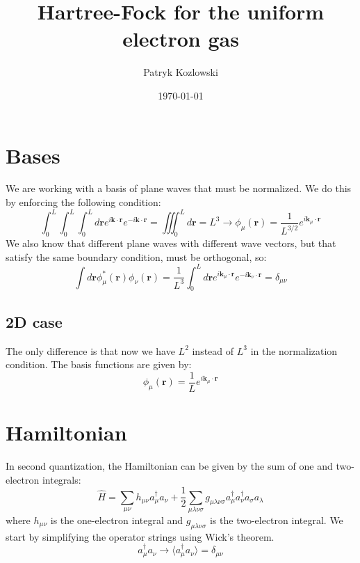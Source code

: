 \documentclass[12pt]{article}
\author{Patryk Kozlowski}
\title{Hartree-Fock for the uniform electron gas}
\date{\today}
\begin{document}
\maketitle
\section{Bases}
We are working with a basis of plane waves that must be normalized. We do this by enforcing the following condition:
\begin{equation}
    \int_0^L \int_0^L \int_0^L d\mathbf{r} e^{i\mathbf{k}\cdot\mathbf{r}} e^{-i\mathbf{k}\cdot\mathbf{r}} = \iiint_0^L d\mathbf{r} = L^3 \rightarrow \phi_\mu(\mathbf{r}) = \frac{1}{L^{3/2}} e^{i\mathbf{k}_\mu\cdot\mathbf{r}}
\end{equation}
We also know that different plane waves with different wave vectors, but that satisfy the same boundary condition, must be orthogonal, so:
\begin{equation}
    \int d\mathbf{r} \phi^*_\mu(\mathbf{r}) \phi_\nu(\mathbf{r}) = \frac{1}{L^3} \int_0^L d\mathbf{r} e^{i\mathbf{k}_\mu\cdot\mathbf{r}} e^{-i\mathbf{k}_\nu\cdot\mathbf{r}} = \delta_{\mu\nu}
\end{equation}
\subsection{2D case}
The only difference is that now we have $L^2$ instead of $L^3$ in the normalization condition. The basis functions are given by:
\begin{equation}
    \phi_\mu(\mathbf{r}) = \frac{1}{L} e^{i\mathbf{k}_\mu\cdot\mathbf{r}}
\end{equation}
\section{Hamiltonian}
In second quantization, the Hamiltonian can be given by the sum of one and two-electron integrals:
\begin{equation}
    \hat{H} = \sum_{\mu\nu} h_{\mu\nu} a^\dagger_\mu a_\nu + \frac{1}{2} \sum_{\mu\lambda\nu\sigma} g_{\mu\lambda\nu\sigma} a^\dagger_\mu a^\dagger_\nu a_\sigma a_\lambda
\end{equation}
where $h_{\mu\nu}$ is the one-electron integral and $g_{\mu\lambda\nu\sigma}$ is the two-electron integral. We start by simplifying the operator strings using Wick's theorem. 
\begin{equation}
   a^\dagger_\mu a_\nu \rightarrow \langle a^\dagger_\mu a_\nu \rangle = \delta_{\mu\nu}
\end{equation}
\end{document}
